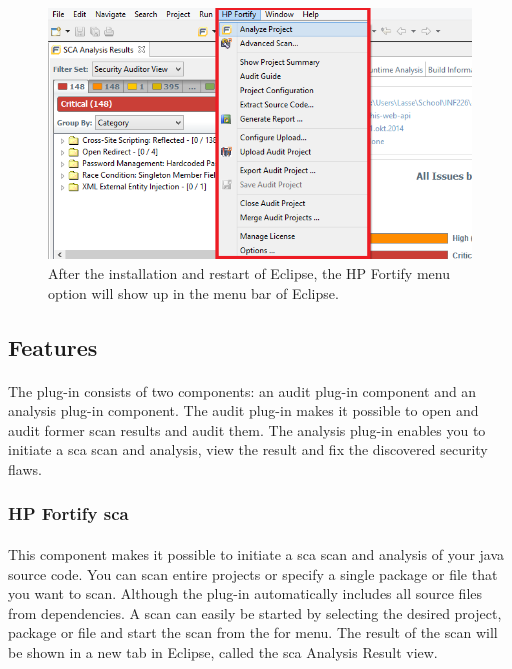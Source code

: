 \documentclass[11pt,english,a4paper]{report}
\begin{document}
\begin{figure}[h]
    \centering
    \includegraphics[scale=0.45]{images/fortifymenu-sc.png}
    \caption{After the installation and restart of Eclipse, the HP Fortify menu option will show up in the menu bar of Eclipse.}
    \label{fig:fortifymenuscreenshot}
\end{figure}

\subsection{Features}
\paragraph{}
The plug-in consists of two components: an audit plug-in component and an analysis plug-in component. 
The audit plug-in makes it possible to open and audit former scan results and audit them. 
The analysis plug-in enables you to initiate a \gls{sca} scan and analysis, view the result and fix the discovered security flaws. \cite{installation-usage-guide}

\subsubsection{HP Fortify \gls{sca}}
\paragraph{}
This component makes it possible to initiate a \gls{sca} scan and analysis of your \gls{java} source code.
You can scan entire projects or specify a single package or file that you want to scan. 
Although the plug-in automatically includes all source files from dependencies. 
A scan can easily be started by selecting the desired project, package or file and start the scan from the \gls{for} menu.
The result of the scan will be shown in a new tab in Eclipse, called the \gls{sca} Analysis Result view. \cite{installation-usage-guide}
\end{document}
